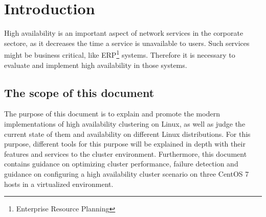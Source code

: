 \section{Introduction}

High availability is an important aspect of network services in the corporate
sectore, as it decreases the time a service is unavailable to users.
Such services might be business critical, like ERP\footnote{Enterprise Resource Planning} systems.
Therefore it is necessary to evaluate and implement high availability in those systems.

\subsection{The scope of this document}
The purpose of this document is to explain and promote the modern implementations 
of high availability clustering on Linux, as well as judge the current state
of them and availability on different Linux distributions.
For this purpose, different tools for this purpose will be explained in 
depth with their features and services to the cluster environment. 
Furthermore, this document contains guidance on optimizing cluster performance, 
failure detection and guidance on configuring a high availability cluster 
scenario on three CentOS 7 hosts in a virtualized environment.
